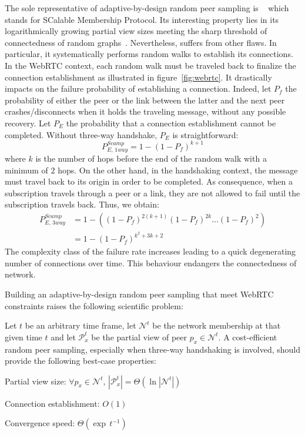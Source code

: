 The sole representative of adaptive-by-design random peer sampling is
\SCAMP{}~\cite{ganesh2001scamp,ganesh2003peer} which stands for
SCalable Membership Protocol. Its interesting property lies in its
logarithmically growing partial view sizes meeting the sharp threshold
of connectedness of random
graphs~\cite{erdos1959random}. Nevertheless, \SCAMP{} suffers from
other flaws. In particular, it systematically performs random walks to
establish its connections. In the WebRTC context, each random walk
must be traveled back to finalize the connection establishment as
illustrated in figure~\ref{fig:webrtc}. It drastically impacts on the
\SCAMP{} failure probability of establishing a connection. Indeed, let
$P_f$ the probability of either the peer or the link between the
latter and the next peer crashes/disconnects when it holds the
traveling message, without any possible recovery. Let $P_E$ the
probability that a connection establishment cannot be
completed. Without three-way handshake, $P_E$ is straightforward:
\begin{equation} P_{E,\,1way}^{Scamp}=1-(1- P_f)^{k+1} \end{equation} where $k$
is the number of hops before the end of the random walk with a minimum of $2$
hops. On the other hand, in the handshaking context, the message must travel
back to its origin in order to be completed. As consequence, when a
subscription travels through a peer or a link, they are not allowed to fail
until the subscription travels back. Thus, we obtain:
\begin{align} P_{E,\,3way}^{Scamp} &=1 - ((1-P_f)^{2(k+1)} (1-P_f)^{2k}
                                     \ldots (1-P_f)^2) \nonumber \\
                                   &=1-(1-P_f)^{k^2+3k+2}
\end{align}
The complexity class of the \SCAMP{} failure rate increases leading to a quick
degenerating number of connections over time. This behaviour endangers the
connectedness of network.

Building an adaptive-by-design random peer sampling that meet WebRTC
constraints raises the following scientific problem:

\begin{problem}
  Let $t$ be an arbitrary time frame, let $\mathcal{N}^t$ be the network
  membership at that given time $t$ and let $\mathcal{P}_x^t$ be the partial
  view of peer $p_x \in \mathcal{N}^t$.  A cost-efficient random peer sampling,
  especially when three-way handshaking is involved, should provide the
  following best-case properties:
  \begin{center}
    Partial view size: \hfill
    $\forall p_x \in \mathcal{N}^t,\, |\mathcal{P}_x^t| = \Theta (\ln
    |\mathcal{N}^t|)$
  \end{center}
  \begin{center}
    Connection establishment: \hfill $O(1)$
  \end{center}
  \begin{center}
    Convergence speed: \hfill $\Theta(\exp \, t^{-1})$
  \end{center}
\end{problem}

